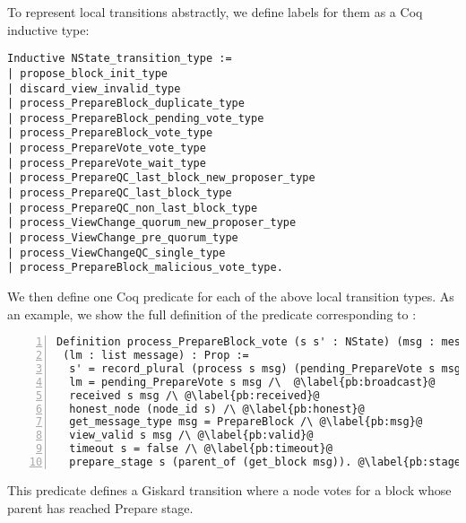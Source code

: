 \documentclass{easychair}
\begin{document}
To represent local transitions abstractly, we define labels for them as a Coq inductive type:
\begin{lstlisting}[language=Coq]
Inductive NState_transition_type := 
| propose_block_init_type
| discard_view_invalid_type
| process_PrepareBlock_duplicate_type 
| process_PrepareBlock_pending_vote_type
| process_PrepareBlock_vote_type 
| process_PrepareVote_vote_type
| process_PrepareVote_wait_type
| process_PrepareQC_last_block_new_proposer_type
| process_PrepareQC_last_block_type 
| process_PrepareQC_non_last_block_type
| process_ViewChange_quorum_new_proposer_type
| process_ViewChange_pre_quorum_type 
| process_ViewChangeQC_single_type
| process_PrepareBlock_malicious_vote_type.
\end{lstlisting}
We then define one Coq predicate for each of the above local transition types. As an example, we show the full definition of the predicate corresponding to :
\begin{lstlisting}[language=Coq,numbers=left,numberstyle=\footnotesize,escapechar=@]
Definition process_PrepareBlock_vote (s s' : NState) (msg : message) 
 (lm : list message) : Prop :=
  s' = record_plural (process s msg) (pending_PrepareVote s msg) /\ @\label{pb:post-state}@
  lm = pending_PrepareVote s msg /\  @\label{pb:broadcast}@
  received s msg /\ @\label{pb:received}@
  honest_node (node_id s) /\ @\label{pb:honest}@
  get_message_type msg = PrepareBlock /\ @\label{pb:msg}@
  view_valid s msg /\ @\label{pb:valid}@
  timeout s = false /\ @\label{pb:timeout}@
  prepare_stage s (parent_of (get_block msg)). @\label{pb:stage}@
\end{lstlisting}
This predicate defines a Giskard transition where a node votes for a block whose parent has reached Prepare stage.
\end{document}
